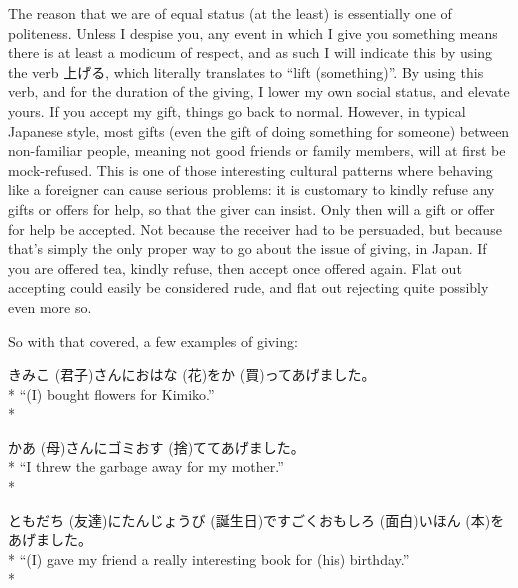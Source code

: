 \documentclass[11pt, b5paper, twoside, openright, onecolumn]{book}
\makeatletter
\newcommand*{\rubystack}[2]{{\relscale{0.5}%
  \begin{tabular}[b]{@{}c@{}}%
    {#1}\\%
   {\textscale{2}{#2}}%
  \end{tabular}}%
}
\DeclareRobustCommand*{\ruby}[2]{%
  \mbox{%
    \setlength{\parskip}{0ex}%
    \BeginAccSupp{method=pdfstringdef,ActualText={#1}}%
      \rubystack{\phantom{#2}}{#1}%
      \llap{%
        \rubystack{#2}{\phantom{#1}}%
      }%
    \EndAccSupp{}%
  }%
}
\renewcommand*{\ruby}[2]{#2 (#1)}%
\newenvironment{exampleblock}{
\setlength{\parindent}{0.6in}
\begin{minipage}[t]{\dimexpr\textwidth-\parindent}}
{\end{minipage}}
\makeatother
\begin{document}
The reason that we are of equal status (at the least) is essentially one of politeness. Unless I despise you‚ any event in which I give you something means there is at least a modicum of respect‚ and as such I will indicate this by using the verb 上げる‚ which literally translates to “lift (something)”. By using this verb‚ and for the duration of the giving‚ I lower my own social status‚ and elevate yours. If you accept my gift‚ things go back to normal. However‚ in typical Japanese style‚ most gifts (even the gift of doing something for someone) between non-familiar people‚ meaning not good friends or family members‚ will at first be mock-refused. This is one of those interesting cultural patterns where behaving like a foreigner can cause serious problems: it is customary to kindly refuse any gifts or offers for help‚ so that the giver can insist. Only then will a gift or offer for help be accepted. Not because the receiver had to be persuaded‚ but because that’s simply the only proper way to go about the issue of giving‚ in Japan. If you are offered tea‚ kindly refuse‚ then accept once offered again. Flat out accepting could easily be considered rude‚ and flat out rejecting quite possibly even more so.

So with that covered‚ a few examples of giving:

\vspace{0.4cm}
\begin{exampleblock}
\ruby{君子}{きみこ}さんにお\ruby{花}{はな}を\ruby{買}{か}ってあげました。 \\* 
“(I) bought flowers for Kimiko.” \\* 
\end{exampleblock}
\vspace{0.2cm}

\begin{exampleblock}
\ruby{母}{かあ}さんにゴミお\ruby{捨}{す}ててあげました。 \\* 
“I threw the garbage away for my mother.” \\* 
\end{exampleblock}
\vspace{0.2cm}

\begin{exampleblock}
\ruby{友達}{ともだち}に\ruby{誕生日}{たんじょうび}ですごく\ruby{面白}{おもしろ}い\ruby{本}{ほん}をあげました。 \\* 
“(I) gave my friend a really interesting book for (his) birthday.” \\* 
\end{exampleblock}
\vspace{0.2cm}
\end{document}
